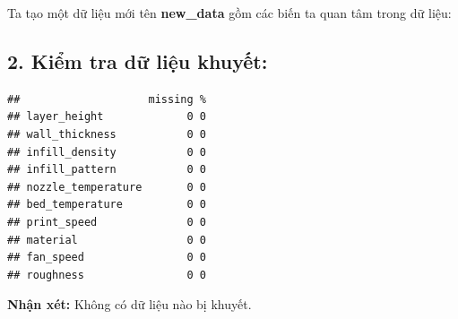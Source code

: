 Ta tạo một dữ liệu mới tên \textbf{new\_data} gồm các biến ta quan tâm
trong dữ liệu:

\begin{Shaded}
\begin{Highlighting}[]
\OtherTok{\textless{}{-}} \NormalTok{(}\NormalTok{,}\NormalTok{,}\NormalTok{,}
\NormalTok{,}\NormalTok{, }\NormalTok{,}\NormalTok{,}\NormalTok{,}\NormalTok{,}\NormalTok{)}
\OtherTok{\textless{}{-}}
\end{Highlighting}
\end{Shaded}

\subsection{2. Kiểm tra dữ liệu khuyết:}

\begin{Shaded}
\begin{Highlighting}[]
\end{Highlighting}
\end{Shaded}

\begin{verbatim}
##                    missing %
## layer_height             0 0
## wall_thickness           0 0
## infill_density           0 0
## infill_pattern           0 0
## nozzle_temperature       0 0
## bed_temperature          0 0
## print_speed              0 0
## material                 0 0
## fan_speed                0 0
## roughness                0 0
\end{verbatim}

\textbf{Nhận xét:} Không có dữ liệu nào bị khuyết.
\newpage